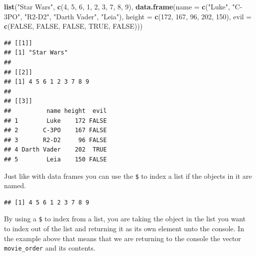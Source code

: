 \documentclass[
]{book}
\newenvironment{Shaded}{\begin{snugshade}}{\end{snugshade}}
\newcommand{\AttributeTok}[1]{\textcolor[rgb]{0.13,0.29,0.53}{#1}}
\newcommand{\ConstantTok}[1]{\textcolor[rgb]{0.56,0.35,0.01}{#1}}
\newcommand{\DecValTok}[1]{\textcolor[rgb]{0.00,0.00,0.81}{#1}}
\newcommand{\FunctionTok}[1]{\textcolor[rgb]{0.13,0.29,0.53}{\textbf{#1}}}
\newcommand{\NormalTok}[1]{#1}
\newcommand{\SpecialCharTok}[1]{\textcolor[rgb]{0.81,0.36,0.00}{\textbf{#1}}}
\newcommand{\StringTok}[1]{\textcolor[rgb]{0.31,0.60,0.02}{#1}}
\begin{document}
\begin{Shaded}
\begin{Highlighting}[]
\FunctionTok{list}\NormalTok{(}\StringTok{"Star Wars"}\NormalTok{,}
     \FunctionTok{c}\NormalTok{(}\DecValTok{4}\NormalTok{, }\DecValTok{5}\NormalTok{, }\DecValTok{6}\NormalTok{, }\DecValTok{1}\NormalTok{, }\DecValTok{2}\NormalTok{, }\DecValTok{3}\NormalTok{, }\DecValTok{7}\NormalTok{, }\DecValTok{8}\NormalTok{, }\DecValTok{9}\NormalTok{),}
     \FunctionTok{data.frame}\NormalTok{(}\AttributeTok{name =} \FunctionTok{c}\NormalTok{(}\StringTok{"Luke"}\NormalTok{, }\StringTok{"C{-}3PO"}\NormalTok{, }\StringTok{"R2{-}D2"}\NormalTok{, }\StringTok{"Darth Vader"}\NormalTok{, }\StringTok{"Leia"}\NormalTok{),}
                \AttributeTok{height =} \FunctionTok{c}\NormalTok{(}\DecValTok{172}\NormalTok{, }\DecValTok{167}\NormalTok{, }\DecValTok{96}\NormalTok{, }\DecValTok{202}\NormalTok{, }\DecValTok{150}\NormalTok{),}
                \AttributeTok{evil =} \FunctionTok{c}\NormalTok{(}\ConstantTok{FALSE}\NormalTok{, }\ConstantTok{FALSE}\NormalTok{, }\ConstantTok{FALSE}\NormalTok{, }\ConstantTok{TRUE}\NormalTok{, }\ConstantTok{FALSE}\NormalTok{)))}
\end{Highlighting}
\end{Shaded}

\begin{verbatim}
## [[1]]
## [1] "Star Wars"
## 
## [[2]]
## [1] 4 5 6 1 2 3 7 8 9
## 
## [[3]]
##          name height  evil
## 1        Luke    172 FALSE
## 2       C-3PO    167 FALSE
## 3       R2-D2     96 FALSE
## 4 Darth Vader    202  TRUE
## 5        Leia    150 FALSE
\end{verbatim}

Just like with data frames you can use the \texttt{\$} to index a list if the objects in it are named.

\begin{Shaded}
\end{Shaded}

\begin{verbatim}
## [1] 4 5 6 1 2 3 7 8 9
\end{verbatim}

By using a \texttt{\$} to index from a list, you are taking the object in the list you want to index out of the list and returning it as its own element unto the console. In the example above that means that we are returning to the console the vector \texttt{movie\_order} and its contents.
\end{document}
